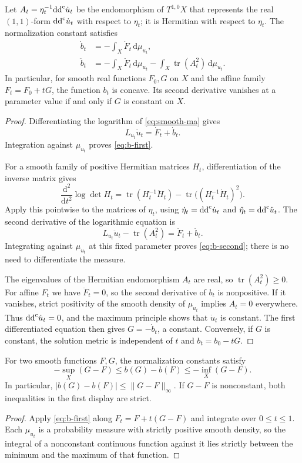 \begin{theorem}\label{thm:b-derivatives}
Let $A_t=\eta_t^{-1}\mathrm{dd}^{\mathrm{c}}\dot u_t$ be the endomorphism of $T^{1,0}X$ that represents the real $(1,1)$-form $\mathrm{dd}^{\mathrm{c}}\dot u_t$ with respect to $\eta_t$; it is Hermitian with respect to $\eta_t$. The normalization constant satisfies
\begin{align}
 \dot b_t&=-\int_X\dot F_t\,\mathrm{d}\mu_{u_t},\label{eq:b-first}\\
 \ddot b_t&=-\int_X\ddot F_t\,\mathrm{d}\mu_{u_t}
 -\int_X\operatorname{tr}(A_t^2)\,\mathrm{d}\mu_{u_t}.\label{eq:b-second}
\end{align}
In particular, for smooth real functions $F_0,G$ on $X$ and the affine family $F_t=F_0+tG$, the function $b_t$ is concave. Its second derivative vanishes at a parameter value if and only if $G$ is constant on $X$.
\end{theorem}
\begin{proof}
Differentiating the logarithm of \eqref{eq:smooth-ma} gives
\[
 L_{u_t}\dot u_t=\dot F_t+\dot b_t.
\]
Integration against $\mu_{u_t}$ proves \eqref{eq:b-first}.

For a smooth family of positive Hermitian matrices $H_t$, differentiation of the inverse matrix gives
\[
 \frac{\mathrm{d}^2}{\mathrm{d}t^2}\log\det H_t
 =\operatorname{tr}(H_t^{-1}\ddot H_t)
  -\operatorname{tr}\bigl((H_t^{-1}\dot H_t)^2\bigr).
\]
Apply this pointwise to the matrices of $\eta_t$, using $\dot\eta_t=\mathrm{dd}^{\mathrm{c}}\dot u_t$ and $\ddot\eta_t=\mathrm{dd}^{\mathrm{c}}\ddot u_t$. The second derivative of the logarithmic equation is
\[
 L_{u_t}\ddot u_t-\operatorname{tr}(A_t^2)
 =\ddot F_t+\ddot b_t.
\]
Integrating against $\mu_{u_t}$ at this fixed parameter proves \eqref{eq:b-second}; there is no need to differentiate the measure.

The eigenvalues of the Hermitian endomorphism $A_t$ are real, so $\operatorname{tr}(A_t^2)\geq0$. For affine $F_t$ we have $\ddot F_t=0$, so the second derivative of $b_t$ is nonpositive. If it vanishes, strict positivity of the smooth density of $\mu_{u_t}$ implies $A_t=0$ everywhere. Thus $\mathrm{dd}^{\mathrm{c}}\dot u_t=0$, and the maximum principle shows that $\dot u_t$ is constant. The first differentiated equation then gives $G=-\dot b_t$, a constant. Conversely, if $G$ is constant, the solution metric is independent of $t$ and $b_t=b_0-tG$.
\end{proof}

\begin{corollary}\label{cor:b-lipschitz}
For two smooth functions $F,G$, the normalization constants satisfy
\[
 -\sup_X(G-F)\leq b(G)-b(F)\leq-\inf_X(G-F).
\]
In particular, $|b(G)-b(F)|\leq\|G-F\|_\infty$. If $G-F$ is nonconstant, both inequalities in the first display are strict.
\end{corollary}
\begin{proof}
Apply \eqref{eq:b-first} along $F_t=F+t(G-F)$ and integrate over $0\leq t\leq1$. Each $\mu_{u_t}$ is a probability measure with strictly positive smooth density, so the integral of a nonconstant continuous function against it lies strictly between the minimum and the maximum of that function.
\end{proof}

